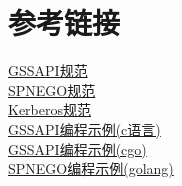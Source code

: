 \documentclass[a4paper]{scrartcl}
\begin{document}
\section{参考链接}
\href{https://tools.ietf.org/html/rfc2743}{GSSAPI规范}
\\
\href{https://tools.ietf.org/html/rfc4178}{SPNEGO规范}
\\
\href{https://tools.ietf.org/html/rfc4121}{Kerberos规范}
\\
\href{https://github.com/pbrezina/gssapi-auth}{GSSAPI编程示例(c语言)}
\\
\href{https://github.com/myml/gssapi-example}{GSSAPI编程示例(cgo)}
\\
\href{https://github.com/myml/gssapi-example}{SPNEGO编程示例(golang)}
\clearpage
\end{document}
